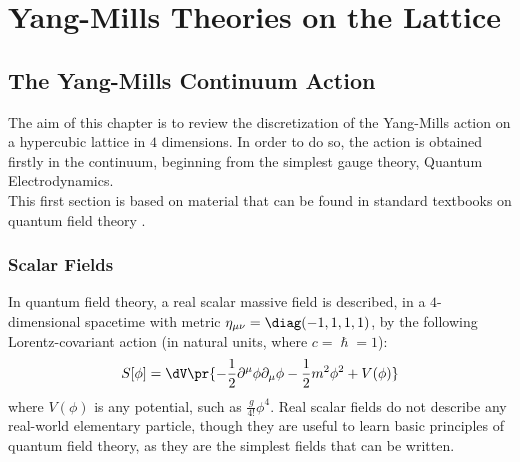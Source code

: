 \pagestyle{myFancy}
\chapter{Yang-Mills Theories on the Lattice\label{Chap:LatticeQCD}}
\section{The Yang-Mills Continuum Action}
The aim of this chapter is to review the discretization of the Yang-Mills action on a hypercubic lattice in $4$ dimensions.
In order to do so, the action is obtained firstly in the continuum, beginning from the simplest gauge theory, Quantum Electrodynamics.\\
This first section is based on material that can be found in standard textbooks on quantum field theory \cite{srednicki2007quantum, peskin1995introduction, weinberg1995quantum, kaku1993quantum, ramond1997field}.

\subsection{Scalar Fields}
In quantum field theory, a real scalar massive field is described, in a $4$-dimensional spacetime with metric $\eta_{\mu\nu} = \diag(-1,1,1,1)$, by the following Lorentz-covariant action (in natural units, where $c = \hslash = 1$):
\begin{equation}
    S[\phi] = \dV \pr{-\frac12 \partial^\mu\phi\partial_\mu\phi -\frac12 m^2\phi^2 +V(\phi)} \label{1:ActionScalar}
\end{equation}
where $V(\phi)$ is any potential, such as 
$\frac{g}{4!}\phi^4$.
Real scalar fields do not describe any real-world elementary particle, though they are useful to learn basic principles of quantum field theory, as they are the simplest fields that can be written.

